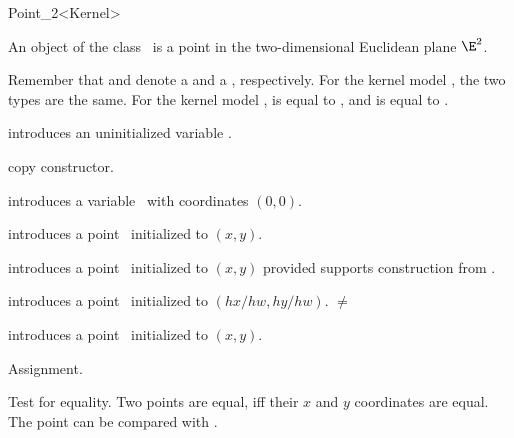 \begin{ccRefClass} {Point_2<Kernel>}

\ccDefinition
An object of the class \ccRefName\ is a point in the two-dimensional
Euclidean plane $\E^2$. 

Remember that  and  denote a
 and a , respectively. For the kernel
model , the two types are the same. For the
kernel model ,  is equal
to , and  is equal to
.

\ccTypes
{}
\ccThreeToTwo


\ccCreation
{}


\ccHidden {}
             {introduces an uninitialized variable \ccVar.}

\ccHidden {}
            {copy constructor.}

            {introduces a variable \ccVar\ with  coordinates
              $(0,0)$.}

            {introduces a point \ccVar\ initialized to $(x,y)$.}

            {introduces a point \ccVar\ initialized to $(x,y)$
             provided  supports construction from .}

            {introduces a point \ccVar\ initialized to $(hx/hw,hy/hw)$.
             \ccPrecond {} $\neq$  }

            {introduces a point \ccVar\ initialized to $(x,y)$.}


\ccOperations

\ccHidden {}
        {Assignment.}

       {Test for equality. Two points are equal, iff their $x$ and $y$ 
        coordinates are equal. The point can be compared with
                .}


\end{ccRefClass}
